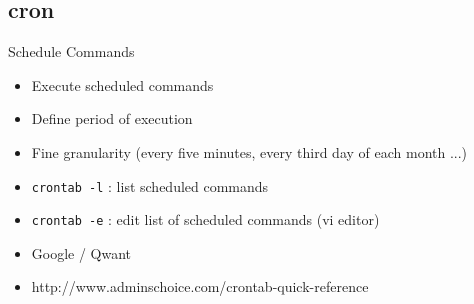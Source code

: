\subsection{cron}

\begin{frame}[fragile]{Schedule Commands}
  \begin{itemize}
    \pause \item Execute scheduled commands
    \pause \item Define period of execution
    \pause \item Fine granularity (every five minutes, every third day of each month ...)
    \pause \item \texttt{crontab -l} : list scheduled commands
    \pause \item \texttt{crontab -e} : edit list of scheduled commands (vi editor)
    \pause \item Google / Qwant
    \item http://www.adminschoice.com/crontab-quick-reference
  \end{itemize}
\end{frame}


